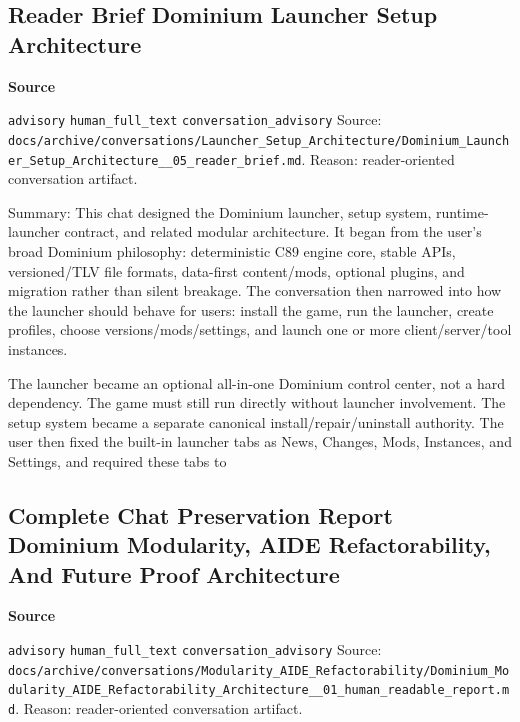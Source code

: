 \documentclass[9pt,a4paper,openany]{book}
\newcommand{\vonecallout}[3]{\par\medskip\noindent\begingroup\setlength{\fboxsep}{7pt}\colorbox{DomCalloutBg}{\parbox{0.94\linewidth}{\textbf{\textcolor{#1}{#2}}\par #3}}\endgroup\par\medskip}
\begin{document}
\subsection{Reader Brief Dominium Launcher Setup Architecture}

\vonecallout{DomSlate}{Source}{\texttt{advisory} \texttt{human\_\allowbreak{}full\_\allowbreak{}text} \texttt{conversation\_\allowbreak{}advisory} Source: \texttt{docs/\allowbreak{}archive/\allowbreak{}conversations/\allowbreak{}Launcher\_\allowbreak{}Setup\_\allowbreak{}Architecture/\allowbreak{}Dominium\_\allowbreak{}Launcher\_\allowbreak{}Setup\_\allowbreak{}Architecture\_\allowbreak{}\_\allowbreak{}05\_\allowbreak{}reader\_\allowbreak{}brief.\allowbreak{}md}.\allowbreak{} Reason: reader-\allowbreak{}oriented conversation artifact.\allowbreak{}}

Summary: This chat designed the Dominium launcher, setup system, runtime-\allowbreak{}launcher contract, and related modular architecture.\allowbreak{} It began from the user's broad Dominium philosophy: deterministic C89 engine core, stable APIs, versioned/\allowbreak{}TLV file formats, data-\allowbreak{}first content/\allowbreak{}mods, optional plugins, and migration rather than silent breakage.\allowbreak{} The conversation then narrowed into how the launcher should behave for users: install the game, run the launcher, create profiles, choose versions/\allowbreak{}mods/\allowbreak{}settings, and launch one or more client/\allowbreak{}server/\allowbreak{}tool instances.\allowbreak{}


The launcher became an optional all-\allowbreak{}in-\allowbreak{}one Dominium control center, not a hard dependency.\allowbreak{} The game must still run directly without launcher involvement.\allowbreak{} The setup system became a separate canonical install/\allowbreak{}repair/\allowbreak{}uninstall authority.\allowbreak{} The user then fixed the built-\allowbreak{}in launcher tabs as News, Changes, Mods, Instances, and Settings, and required these tabs to



\subsection{Complete Chat Preservation Report Dominium Modularity, AIDE Refactorability, And Future Proof Architecture}

\vonecallout{DomSlate}{Source}{\texttt{advisory} \texttt{human\_\allowbreak{}full\_\allowbreak{}text} \texttt{conversation\_\allowbreak{}advisory} Source: \texttt{docs/\allowbreak{}archive/\allowbreak{}conversations/\allowbreak{}Modularity\_\allowbreak{}AIDE\_\allowbreak{}Refactorability/\allowbreak{}Dominium\_\allowbreak{}Modularity\_\allowbreak{}AIDE\_\allowbreak{}Refactorability\_\allowbreak{}Architecture\_\allowbreak{}\_\allowbreak{}01\_\allowbreak{}human\_\allowbreak{}readable\_\allowbreak{}report.\allowbreak{}md}.\allowbreak{} Reason: reader-\allowbreak{}oriented conversation artifact.\allowbreak{}}
\end{document}
